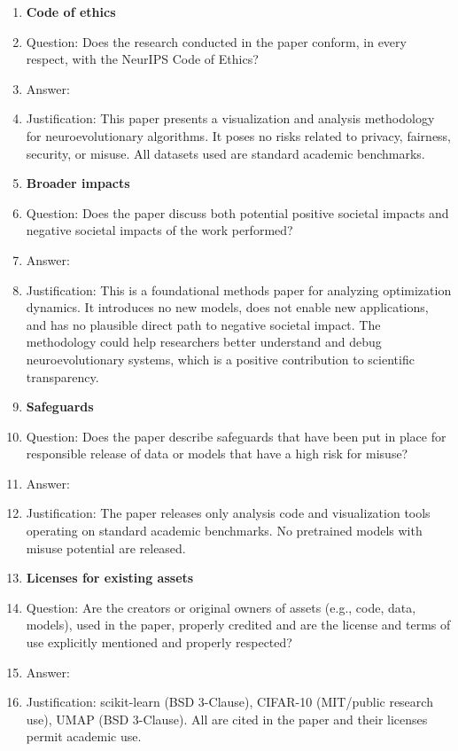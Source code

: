 \begin{enumerate}
\item {\bf Code of ethics}
    \item[] Question: Does the research conducted in the paper conform, in every respect, with the NeurIPS Code of Ethics?
    \item[] Answer: \answerYes{}
    \item[] Justification: This paper presents a visualization and analysis methodology for neuroevolutionary algorithms. It poses no risks related to privacy, fairness, security, or misuse. All datasets used are standard academic benchmarks.

\item {\bf Broader impacts}
    \item[] Question: Does the paper discuss both potential positive societal impacts and negative societal impacts of the work performed?
    \item[] Answer: \answerNA{}
    \item[] Justification: This is a foundational methods paper for analyzing optimization dynamics. It introduces no new models, does not enable new applications, and has no plausible direct path to negative societal impact. The methodology could help researchers better understand and debug neuroevolutionary systems, which is a positive contribution to scientific transparency.

\item {\bf Safeguards}
    \item[] Question: Does the paper describe safeguards that have been put in place for responsible release of data or models that have a high risk for misuse?
    \item[] Answer: \answerNA{}
    \item[] Justification: The paper releases only analysis code and visualization tools operating on standard academic benchmarks. No pretrained models with misuse potential are released.

\item {\bf Licenses for existing assets}
    \item[] Question: Are the creators or original owners of assets (e.g., code, data, models), used in the paper, properly credited and are the license and terms of use explicitly mentioned and properly respected?
    \item[] Answer: \answerYes{}
    \item[] Justification: scikit-learn \cite{pedregosa2011scikit} (BSD 3-Clause), CIFAR-10 \cite{krizhevsky2009learning} (MIT/public research use), UMAP \cite{mcinnes2018umap} (BSD 3-Clause). All are cited in the paper and their licenses permit academic use.


\end{enumerate}

